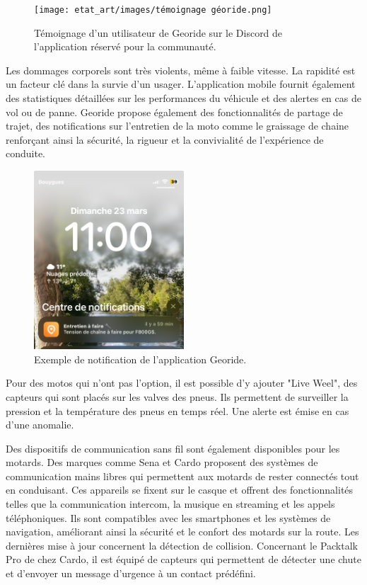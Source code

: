 \begin{figure}[H]
    \centering
    \texttt{[image: etat\_art/images/témoignage géoride.png]} 
    \caption{Témoignage d'un utilisateur de Georide sur le Discord de l'application réservé pour la communauté.}
    \label{temoignage}
\end{figure}
Les dommages corporels sont très violents, même à faible vitesse. La rapidité est un facteur clé dans la survie d'un usager. L’application mobile fournit également des statistiques détaillées sur les performances du véhicule et des alertes en cas de vol ou de panne. Georide propose également des fonctionnalités de partage de trajet, des notifications sur l'entretien de la moto comme le graissage de chaine renforçant ainsi la sécurité, la rigueur et la convivialité de l’expérience de conduite.
\begin{figure}[H]
    \centering
    \includegraphics[width=0.5\textwidth]{images/notification_georide.jpg} 
    \caption{Exemple de notification de l'application Georide.}
\end{figure}
Pour des motos qui n'ont pas l'option, il est possible d'y ajouter "Live Weel", des capteurs qui sont placés sur les valves des pneus. Ils permettent de surveiller la pression et la température des pneus en temps réel. Une alerte est émise en cas d'une anomalie.
\vspace{0.5cm}

Des dispositifs de communication sans fil sont également disponibles pour les motards. Des marques comme Sena et Cardo\cite{cardo} proposent des systèmes de communication mains libres qui permettent aux motards de rester connectés tout en conduisant. Ces appareils se fixent sur le casque et offrent des fonctionnalités telles que la communication intercom, la musique en streaming et les appels téléphoniques. Ils sont compatibles avec les smartphones et les systèmes de navigation, améliorant ainsi la sécurité et le confort des motards sur la route. Les dernières mise à jour concernent la détection de collision. Concernant le Packtalk Pro de chez Cardo, il est équipé de capteurs qui permettent de détecter une chute et d'envoyer un message d'urgence à un contact prédéfini.\\

